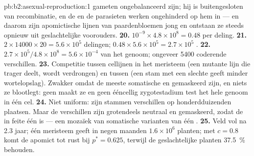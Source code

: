 \begin{solution}{pb:b2:asexual-reproduction:1}
gameten ongebalanceerd zijn; hij is buitengesloten van recombinatie, en de
 en de parasieten werken ongehinderd op hem in --- en
daarom zijn apomictische lijnen van paardenbloemen jong en ontstaan ze
steeds opnieuw uit geslachtelijke voorouders.
\textbf{20.} $10^{-9}\times 4.8\times 10^{8} = 0.48$ per deling.
\textbf{21.} $2\times \num{14000}\times 20 = 5.6\times 10^{5}$
delingen; $0.48\times 5.6\times 10^{5} = 2.7\times 10^{5}$
.
\textbf{22.} $2.7\times 10^{5}/4.8\times 10^{8} = 5.6\times 10^{-4}$ van
het genoom; ongeveer \num{5400} coderende verschillen.
\textbf{23.} Competitie tussen cellijnen in het meristeem (een mutante lijn
die trager deelt, wordt verdrongen) en tussen  (een stam met een
slechte  geeft minder wortelopslag). Zwakker omdat de meeste
somatische   en gemaskeerd zijn, en niets ze blootlegt:
geen  maakt ze  en geen ééncellig zygotestadium test het
hele genoom in één cel.
\textbf{24.} Niet uniform: zijn stammen verschillen op honderdduizenden
plaatsen. Maar de verschillen zijn grotendeels neutraal en gemaskeerd,
zodat de  in feite één  is --- een mozaïek van somatische
varianten van één .
\textbf{25.} Veld vol na 2.3 jaar; één meristeem geeft in negen maanden
$1.6\times 10^{6}$ planten; met $c = 0.8$ komt de apomict tot rust bij
$p^* = 0.625$, terwijl de geslachtelijke planten \qty{37.5}{\%} behouden.
\end{solution}
